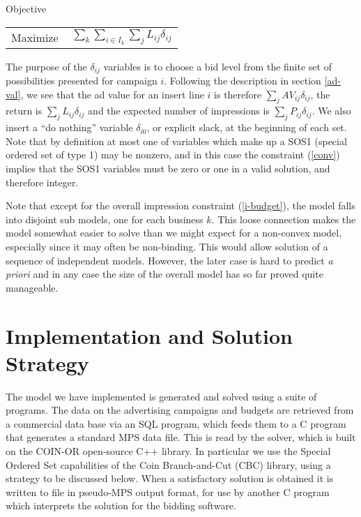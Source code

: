 \documentclass[finalversion,simpleeqnnos]{yrl}
\begin{document}
\vskip 5pt

Objective
\vskip 5pt
   \begin{tabular}{ll}
    {\rm Maximize} &$ \ \sum_k\sum_{i\in I_k}\sum_j L_{ij} \delta_{ij}$
   \end{tabular}
\vskip 10pt

The purpose of the $\delta_{ij}$ variables is to choose a bid level from the finite set of possibilities presented for campaign $i$. Following the description in section \ref{ad-val}, we see that the ad value for an insert line $i$ is therefore $\sum_j AV_{ij}\delta_{ij}$, the return is $\sum_j L_{ij}\delta_{ij}$ and the expected number of impressions is $\sum_j P_{ij}\delta_{ij}$. We also insert a ``do nothing'' variable $\delta_{i0}$, or explicit slack, at the beginning of each set. Note that by definition at most one of variables which make up a SOS1 (special ordered set \cite{SOS} of type 1) may be nonzero, and in this case the constraint (\ref{conv}) implies that the SOS1 variables must be zero or one in a valid solution, and therefore integer.

Note that except for the overall impression constraint (\ref{i-budget}), the model falls into disjoint sub models, one for each business $k$. This loose connection makes the model somewhat easier to solve than we might expect for a non-convex model, especially since it may often be non-binding. This would allow solution of a sequence of independent models. However, the later case is hard to predict {\em a priori} and in any case the size of the overall model has so far proved quite manageable.

\section{Implementation and Solution Strategy}

The model we have implemented is generated and solved using a suite of programs. The data on the advertising campaigns and budgets are retrieved from a commercial data base via an SQL program, which feeds them to a C program that generates a standard MPS data file. This is read by the solver, which is built on the COIN-OR open-source C++ library\cite{coin1}. In particular we use the Special Ordered Set capabilities of the Coin Branch-and-Cut (CBC) library\cite{coin2}, using a strategy to be discussed below. When a satisfactory solution is obtained it is written to file in pseudo-MPS output format, for use by another C program which interprets the solution for the bidding software.
\end{document}
